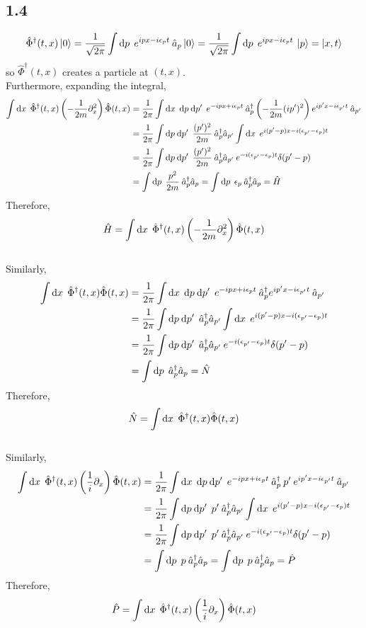 \documentclass[12pt]{extarticle}
\newcommand{\field}{\hat{\Phi}}
\newcommand{\dfield}{\hat{\Phi}^\dagger}
\begin{document}
\subsection*{1.4}
\begin{align*}
\dfield(t, x) \ket{0} = \frac{1}{\sqrt{2 \pi}} \int \d{p} \: e^{i p x - i\epsilon_p t} \: \a_p \ket{0} =  \frac{1}{\sqrt{2 \pi}} \int \d{p} \: e^{i p x - i\epsilon_p t} \: \ket{p} = \ket{x, t}
\end{align*}
so $\dfield(t, x)$ creates a particle at $(t, x)$. \bigskip\\
Furthermore, expanding the integral,
\begin{align*}
\int \d{x} \: \dfield(t, x) \left( - \frac{1}{2m} \partial_x^2\right) \field(t, x) & = \frac{1}{2\pi} \int \d{x} \: \d{p} \d{p'} \: e^{- i p x + i \epsilon_p t} \: \adag_p \left(- \frac{1}{2 m} ( i p')^2 \right) e^{i p' x - i \epsilon_{p'} t} \: \a_{p'} 
\\
& = \frac{1}{2\pi} \int \d{p} \d{p'} \: \frac{(p')^2}{2m} \: \adag_p \a_{p'}  \int \d{x} \: e^{i (p' - p) x - i (\epsilon_{p'} - \epsilon_{p}) t}
\\
& = \frac{1}{2\pi} \int \d{p} \d{p'} \: \frac{(p')^2}{2m}  \: \adag_p \a_{p'} \: e^{- i (\epsilon_{p'} - \epsilon_{p}) t} \delta(p' - p)
\\
& = \int \d{p} \: \frac{p^2}{2m}  \: \adag_p \a_{p} = \int \d{p} \: \epsilon_p \: \adag_p \a_{p} = \hamilt
\end{align*}
Therefore,
\[\hamilt = \int \d{x} \: \dfield(t, x) \left( - \frac{1}{2m} \partial_x^2\right) \field(t, x)\]
\bigskip\\
Similarly,
\begin{align*}
\int \d{x} \: \dfield(t, x) \field(t, x) & = \frac{1}{2\pi} \int \d{x} \: \d{p} \d{p'} \: e^{- i p x + i \epsilon_p t} \: \adag_p  e^{i p' x - i \epsilon_{p'} t} \: \a_{p'} 
\\
& = \frac{1}{2\pi} \int \d{p} \d{p'} \: \adag_p \a_{p'}  \int \d{x} \: e^{i (p' - p) x - i (\epsilon_{p'} - \epsilon_{p}) t}
\\
& = \frac{1}{2\pi} \int \d{p} \d{p'} \: \adag_p \a_{p'} \: e^{- i (\epsilon_{p'} - \epsilon_{p}) t} \delta(p' - p)
\\
& = \int \d{p} \: \adag_p \a_{p} = \hat{N}
\end{align*}
Therefore,
\[ \hat{N} = \int \d{x} \: \dfield(t, x) \field(t, x)\]
\bigskip\\
Similarly,
\begin{align*}
\int \d{x} \: \dfield(t, x) \left( \frac{1}{i} \partial_x\right) \field(t, x) & = \frac{1}{2\pi} \int \d{x} \: \d{p} \d{p'} \: e^{- i p x + i \epsilon_p t} \: \adag_p \: p' \: e^{i p' x - i \epsilon_{p'} t} \: \a_{p'} 
\\
& = \frac{1}{2\pi} \int \d{p} \d{p'} \: p' \: \adag_p \a_{p'}  \int \d{x} \: e^{i (p' - p) x - i (\epsilon_{p'} - \epsilon_{p}) t}
\\
& = \frac{1}{2\pi} \int \d{p} \d{p'} \: p'  \: \adag_p \a_{p'} \: e^{- i (\epsilon_{p'} - \epsilon_{p}) t} \delta(p' - p)
\\
& = \int \d{p} \: p \: \adag_p \a_{p} = \int \d{p} \: p \: \adag_p \a_{p} = \hat{P}
\end{align*}
Therefore,
\[\hat{P} = \int \d{x} \: \dfield(t, x) \left( \frac{1}{i} \partial_x\right) \field(t, x)\]
\end{document}
